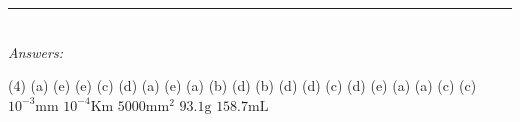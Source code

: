 \documentclass[main.tex]{subfiles}
\begin{document}
\begin{fullwidth}
\par\noindent\rule{0.5\textwidth}{0.4pt}\\
\emph{Answers:}\\
\vspace{0.5cm}
\begin{tasks}[counter-format={tsk[1].}, label-align=left, label-offset={0mm}, label-width={5mm}, item-indent={1mm}, label-format={\bfseries}](4)
\task (a) 
\task (e) 
\task (e) 
\task (c) 
\task (d)
\task (a)
\task (e)
\task (a)
\task (b)
\task (d)
\task (b)
\task (d)
\task (d)
\task (c)
\task (d)
\task (e)
\task (a)
\task (a)
\task (c)
\task (c)
\task {}
\task $10^{-3}\text{mm}$
\task $10^{-4}\text{Km}$
\task \small $5000\text{mm}^2$
\task $93.1\text{g}$
\task \small $158.7\text{mL}$
\end{tasks}






\end{fullwidth}
\restoregeometry
\end{document}
